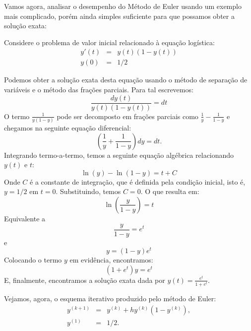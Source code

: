 Vamos agora, analisar o desempenho do Método de Euler usando um exemplo mais complicado, porém ainda simples suficiente para que possamos obter a solução exata:  
\begin{ex}\label{ex_euler_1} Considere o problema de valor inicial relacionado à equação logística:
\begin{eqnarray*}
y'(t)&=&y(t)(1-y(t))\\
y(0)&=&1/2
\end{eqnarray*}
\end{ex}
Podemos obter a solução exata desta equação usando o método de separação de variáveis e o método das frações parciais. Para tal escrevemos:
\begin{equation*}
\frac{dy(t)}{y(t)(1-y(t))}=dt
\end{equation*}
O termo $\frac{1}{y(1-y)}$ pode ser decomposto em frações parciais como $\frac{1}{y}-\frac{1}{1-y}$ e chegamos na seguinte equação diferencial:
\begin{equation*}
\left(\frac{1}{y}+\frac{1}{1-y}\right)dy=dt.
\end{equation*}
Integrando termo-a-termo, temos a seguinte equação algébrica relacionando $y(t)$ e $t$:
\begin{equation*}
\ln(y)-\ln(1-y)=t+C
\end{equation*}
Onde $C$ é a constante de integração, que é definida pela condição inicial, isto é, $y=1/2$ em $t=0$. Substituindo, temos $C=0$. O que resulta em:
\begin{equation*}
\ln\left(\frac{y}{1-y}\right)=t
\end{equation*}
Equivalente a
\begin{equation*}
\frac{y}{1-y}=e^{t}
\end{equation*}
e
\begin{equation*}
y=(1-y)e^{t} 
\end{equation*}
Colocando o termo $y$ em evidência, encontramos:
\begin{equation}
(1+e^t)y=e^{t} 
\end{equation}
E, finalmente, encontramos a solução exata dada por $y(t)=\frac{e^t}{1+e^{t}}$.

Vejamos, agora, o esquema iterativo produzido pelo método de Euler:
\begin{subequations}\label{ite_logistica}
\begin{eqnarray} 
y^{(k+1)}&=& y^{(k)}+h y^{(k)}(1-y^{(k)}), \\
y^{(1)}&=& 1/2.
\end{eqnarray}
\end{subequations}

